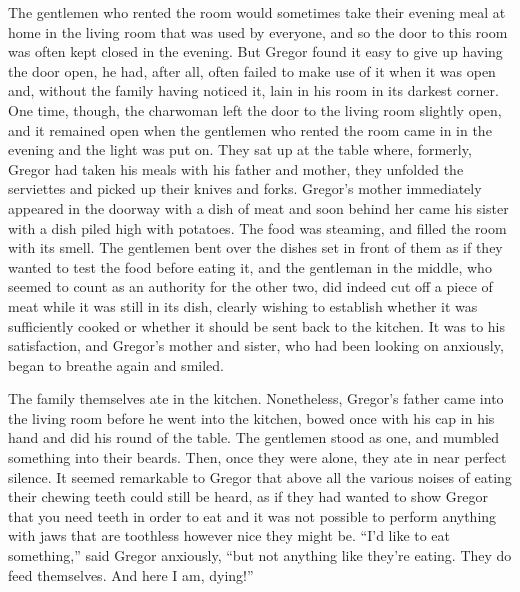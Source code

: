 \documentclass[12pt]{report}
\begin{document}
The gentlemen who rented the room would sometimes take their evening
meal at home in the living room that was used by everyone, and so the
door to this room was often kept closed in the evening. But Gregor found
it easy to give up having the door open, he had, after all, often failed
to make use of it when it was open and, without the family having
noticed it, lain in his room in its darkest corner. One time, though,
the charwoman left the door to the living room slightly open, and it
remained open when the gentlemen who rented the room came in in the
evening and the light was put on. They sat up at the table where,
formerly, Gregor had taken his meals with his father and mother, they
unfolded the serviettes and picked up their knives and forks. Gregor's
mother immediately appeared in the doorway with a dish of meat and soon
behind her came his sister with a dish piled high with potatoes. The
food was steaming, and filled the room with its smell. The gentlemen
bent over the dishes set in front of them as if they wanted to test the
food before eating it, and the gentleman in the middle, who seemed to
count as an authority for the other two, did indeed cut off a piece of
meat while it was still in its dish, clearly wishing to establish
whether it was sufficiently cooked or whether it should be sent back to
the kitchen. It was to his satisfaction, and Gregor's mother and sister,
who had been looking on anxiously, began to breathe again and smiled.

The family themselves ate in the kitchen. Nonetheless, Gregor's father
came into the living room before he went into the kitchen, bowed once
with his cap in his hand and did his round of the table. The gentlemen
stood as one, and mumbled something into their beards. Then, once they
were alone, they ate in near perfect silence. It seemed remarkable to
Gregor that above all the various noises of eating their chewing teeth
could still be heard, as if they had wanted to show Gregor that you need
teeth in order to eat and it was not possible to perform anything with
jaws that are toothless however nice they might be. ``I'd like to eat
something,'' said Gregor anxiously, ``but not anything like they're
eating. They do feed themselves. And here I am, dying!''
\end{document}
